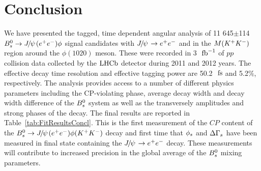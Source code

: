 \clearpage

\section{Conclusion}\label{sec:Concl}

We have presented the tagged, time dependent angular analysis of 11 645$\pm$114 ${{B}^0_{s}}\rightarrow{\ensuremath{{J\mskip -3mu/\mskip -2mu\psi\mskip 2mu}}}({e^+e^-})\phi$ signal candidates with ${{J\mskip -3mu/\mskip -2mu\psi\mskip 2mu}}\rightarrow{\ensuremath{e^+e^-}}$ and in the $M({{K}^+}{{K}^-})$ region around the $\phi(1020)$ meson. These were recorded in 3~$\mbox{\,fb}^{-1}$ of $pp$ collision data collected by the $\mbox{LHCb}$ detector during 2011 and 2012 years. The effective decay time resolution and effective tagging power are 50.2~$\mathrm{ \,fs}$ and 5.2$\%$, respectively. The analysis provides access to a number of different physics parameters including the CP-violating phase, average decay width and decay width difference of the ${{B}^0_{s}}$ system as well as the transversely amplitudes and strong phases of the decay. The final results are reported in Table~\ref{tab:FitResultsConcl}. This is the first measurement of the $CP$ content of the ${{B}^0_{s}}\rightarrow{\ensuremath{{J\mskip -3mu/\mskip -2mu\psi\mskip 2mu}}}({e^+e^-})\phi({{K}^+}{{K}^-})$ decay and first time that ${\phi_{{s}}}$ and ${\Delta\Gamma_{{s}}}$ have been measured in final state containing the ${{J\mskip -3mu/\mskip -2mu\psi\mskip 2mu}}\rightarrow{\ensuremath{e^+e^-}}$ decay. These measurements will contribute to increased precision in the global average of the ${{B}^0_{s}}$ mixing parameters.

